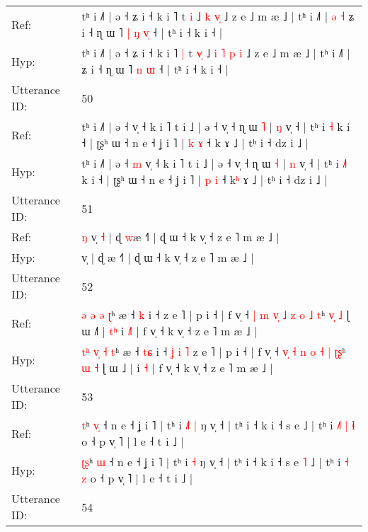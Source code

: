 \documentclass[10pt]{article}
\DeclareRobustCommand{\hl}[1]{{\textcolor{red}{#1}}}
\begin{document}
\begin{longtable}{ll}
Ref: & tʰ i ˩˥ | ə ˧ ʑ i ˧ k i ˥\hl{}\hl{} t \hl{}\hl{i} ˩\hl{}\hl{} \hl{k} \hl{}\hl{v}\hl{̩} ˩ z e ˩ m æ ˩ | tʰ i ˩˥ |\hl{ }\hl{ə}\hl{ }\hl{˧} ʑ i ˧ ɳ ɯ ˥\hl{ }\hl{|} \hl{ŋ} \hl{v}\hl{̩} ˧ | tʰ i ˧ k i ˧ |
 \\
Hyp: & tʰ i ˩˥ | ə ˧ ʑ i ˧ k i ˥\hl{ }\hl{|} t \hl{v}\hl{̩} ˩\hl{ }\hl{i} \hl{˥} \hl{p}\hl{ }\hl{i} ˩ z e ˩ m æ ˩ | tʰ i ˩˥ |\hl{}\hl{}\hl{}\hl{} ʑ i ˧ ɳ ɯ ˥\hl{}\hl{} \hl{n} \hl{}\hl{ɯ} ˧ | tʰ i ˧ k i ˧ |
 \\
\midrule
Utterance ID: & 50 \\
Ref: & tʰ i ˩˥ | ə ˧\hl{}\hl{} v̩ ˧ k i ˥ t i ˩ | ə ˧ v̩ ˧ ɳ ɯ \hl{˥} | \hl{ŋ} v̩ ˧ | tʰ i \hl{}\hl{˧} k i ˧ | ʈʂʰ ɯ ˧ n e ˧ ʝ i ˥ | \hl{k} \hl{ɤ} ˧ k\hl{} ɤ ˩ | tʰ i ˧ dz i ˩ |
 \\
Hyp: & tʰ i ˩˥ | ə ˧\hl{ }\hl{m} v̩ ˧ k i ˥ t i ˩ | ə ˧ v̩ ˧ ɳ ɯ \hl{˧} | \hl{n} v̩ ˧ | tʰ i \hl{˩}\hl{˥} k i ˧ | ʈʂʰ ɯ ˧ n e ˧ ʝ i ˥ | \hl{p} \hl{i} ˧ k\hl{ʰ} ɤ ˩ | tʰ i ˧ dz i ˩ |
 \\
\midrule
Utterance ID: & 51 \\
Ref: & \hl{ŋ}\hl{ }v̩\hl{ }\hl{˧} | ɖ \hl{w}æ ˧˥ | ɖ ɯ ˧ k v̩ ˧ z e ˥ m æ ˩ |
 \\
Hyp: & \hl{}\hl{}v̩\hl{}\hl{} | ɖ \hl{}æ ˧˥ | ɖ ɯ ˧ k v̩ ˧ z e ˥ m æ ˩ |
 \\
\midrule
Utterance ID: & 52 \\
Ref: & \hl{}\hl{ə} \hl{}\hl{ə} \hl{ə} \hl{ʈ}ʰ æ ˧ \hl{}\hl{k} i ˧\hl{}\hl{}\hl{}\hl{}\hl{}\hl{} z e ˥ | p i ˧ | f v̩ ˧ \hl{}\hl{|} \hl{m} \hl{v}\hl{̩} \hl{˩} \hl{z} \hl{o} \hl{˩}\hl{ }\hl{t}ʰ \hl{v}\hl{̩} \hl{˩} ɭ ɯ ˩\hl{˥} |\hl{ }\hl{t}\hl{ʰ} i \hl{˩}\hl{˥} | f v̩ ˧ k v̩ ˧ z e ˥ m æ ˩ |
 \\
Hyp: & \hl{t}\hl{ʰ} \hl{v}\hl{̩} \hl{˧} \hl{t}ʰ æ ˧ \hl{t}\hl{ɕ} i ˧\hl{ }\hl{ʝ}\hl{ }\hl{i}\hl{ }\hl{˥} z e ˥ | p i ˧ | f v̩ ˧ \hl{v}\hl{̩} \hl{˧} \hl{}\hl{n} \hl{o} \hl{˧} \hl{|} \hl{}\hl{ʈ}\hl{ʂ}ʰ \hl{}\hl{ɯ} \hl{˧} ɭ ɯ ˩\hl{} |\hl{}\hl{}\hl{} i \hl{}\hl{˧} | f v̩ ˧ k v̩ ˧ z e ˥ m æ ˩ |
 \\
\midrule
Utterance ID: & 53 \\
Ref: & \hl{}\hl{t}ʰ \hl{v}\hl{̩} ˧ n e ˧ ʝ i ˥ | tʰ i\hl{ }\hl{˩}\hl{˥} \hl{|} ŋ v̩ ˧ | tʰ i ˧ k i ˧ s e\hl{}\hl{} ˩ | tʰ i\hl{ }\hl{˩}\hl{˥} \hl{|} \hl{ɬ} o ˧ p v̩ ˥ | l e ˧ t i ˩ |
 \\
Hyp: & \hl{ʈ}\hl{ʂ}ʰ \hl{}\hl{ɯ} ˧ n e ˧ ʝ i ˥ | tʰ i\hl{}\hl{}\hl{} \hl{˧} ŋ v̩ ˧ | tʰ i ˧ k i ˧ s e\hl{ }\hl{˥} ˩ | tʰ i\hl{}\hl{}\hl{} \hl{˧} \hl{z} o ˧ p v̩ ˥ | l e ˧ t i ˩ |
 \\
\midrule
Utterance ID: & 54 \\

\end{longtable}
\end{document}
